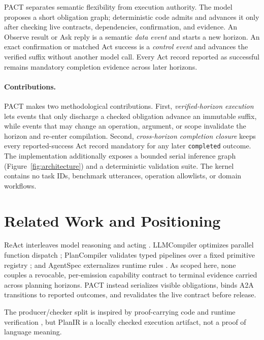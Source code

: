 \documentclass{article}
\begin{document}
PACT separates semantic flexibility from execution authority.  The model
proposes a short obligation graph; deterministic code admits and advances it
only after checking live contracts, dependencies, confirmation, and evidence.
An Observe result or Ask reply is a semantic \emph{data event} and starts a new
horizon.  An exact confirmation or matched Act success is a \emph{control
event} and advances the verified suffix without another model call.  Every Act
record reported as successful remains mandatory completion evidence across
later horizons.

\paragraph{Contributions.}
PACT makes two methodological contributions.  First, \emph{verified-horizon
execution} lets events that only discharge a checked obligation advance an
immutable suffix, while events that may change an operation, argument, or scope
invalidate the horizon and re-enter compilation.  Second, \emph{cross-horizon
completion closure} keeps every reported-success Act record mandatory for any
later \texttt{completed} outcome.  The implementation additionally exposes a
bounded serial inference graph (Figure~\ref{fig:architecture}) and a
deterministic validation suite.  The kernel contains no task IDs, benchmark
utterances, operation allowlists, or domain workflows.

\section{Related Work and Positioning}

ReAct interleaves model reasoning and acting \cite{yao2023react}.
LLMCompiler optimizes parallel function dispatch \cite{kim2024llmcompiler};
PlanCompiler validates typed pipelines over a fixed primitive registry
\cite{harikumar2026plancompiler}; and AgentSpec externalizes runtime rules
\cite{wang2026agentspec}.  As scoped here, none couples a revocable,
per-emission capability contract to terminal evidence carried across planning
horizons.  PACT instead serializes visible obligations, binds A2A transitions
to reported outcomes, and revalidates the live contract before release.

The producer/checker split is inspired by proof-carrying code
\cite{necula1997pcc} and runtime verification \cite{leucker2009runtime}, but
PlanIR is a locally checked execution artifact, not a proof of language meaning.
\end{document}
